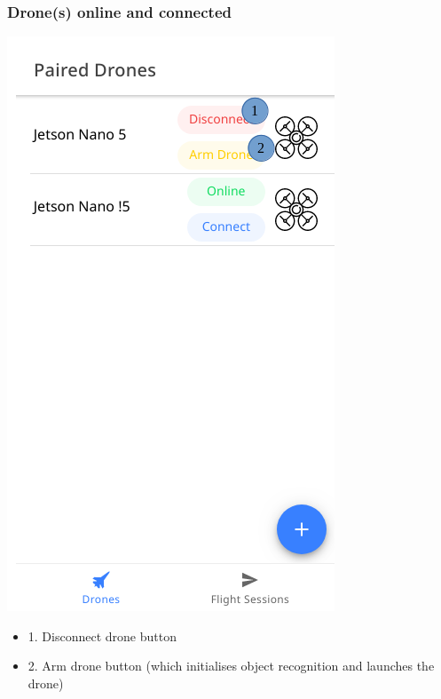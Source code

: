 \subsubsection{Drone(s) online and connected}
\begin{minipage}[c]{0.5\linewidth}
	\centering
	\includegraphics[scale=0.4]{./assets/images/connected.png}
	\label{fig: mainPageConnected}
\end{minipage}
\begin{minipage}[c]{0.5\linewidth}
	\begin{itemize}
			\item 1. Disconnect drone button
			\item 2. Arm drone button (which initialises object recognition \cite{darknet} and launches the drone)
	\end{itemize}
\end{minipage}

\newpage
